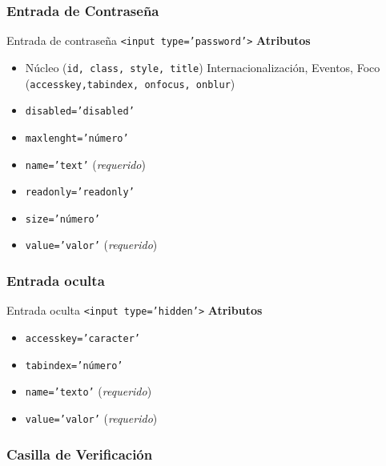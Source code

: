 \documentclass{beamer}
\begin{document}
\subsubsection{Entrada de Contraseña}

\begin{frame}{Entrada de contraseña \texttt{<input type='password'>}} %
    \textbf{Atributos}
    \begin{itemize}
        \item Núcleo (\texttt{id, class, style, title}) Internacionalización,
        Eventos, Foco (\texttt{accesskey,tabindex, onfocus, onblur})
        \item  \texttt{disabled='disabled'}
        \item \texttt{maxlenght='número'}
        \item \texttt{name='text'} (\textit{requerido})
        \item \texttt{readonly='readonly'}
        \item \texttt{size='número'}
        \item \texttt{value='valor'} (\textit{requerido})
    \end{itemize}

\end{frame}

\subsubsection{Entrada oculta}

\begin{frame}{Entrada oculta \texttt{<input type='hidden'>}} %
    \textbf{Atributos}
    \begin{itemize}
        \item  \texttt{accesskey='caracter'}
        \item \texttt{tabindex='número'}
        \item \texttt{name='texto'} (\textit{requerido})
        \item \texttt{value='valor'} (\textit{requerido})
    \end{itemize}
\end{frame}


\subsubsection{Casilla de Verificación} 
\end{document}
